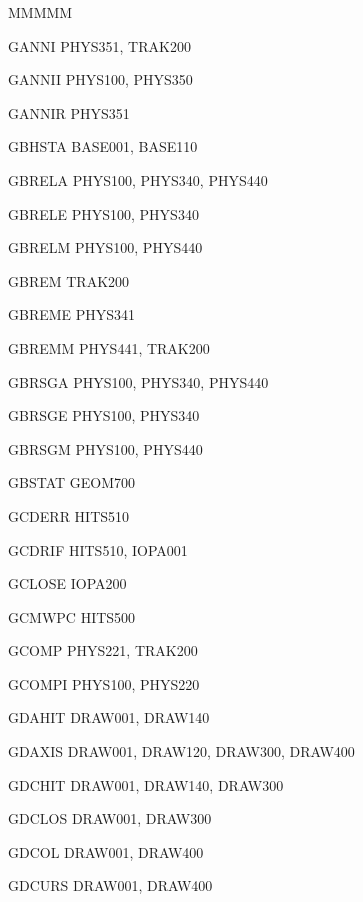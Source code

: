          
           
{\tt\begin{DL}{MMMMM}
\item[GANNI ]PHYS351, TRAK200
\item[GANNII]PHYS100, PHYS350
\item[GANNIR]PHYS351
\item[GBHSTA]BASE001, BASE110
\item[GBRELA]PHYS100, PHYS340, PHYS440
\item[GBRELE]PHYS100, PHYS340
\item[GBRELM]PHYS100, PHYS440
\item[GBREM ]TRAK200
\item[GBREME]PHYS341
\item[GBREMM]PHYS441, TRAK200
\item[GBRSGA]PHYS100, PHYS340, PHYS440
\item[GBRSGE]PHYS100, PHYS340
\item[GBRSGM]PHYS100, PHYS440
\item[GBSTAT]GEOM700
\item[GCDERR]HITS510
\item[GCDRIF]HITS510, IOPA001
\item[GCLOSE]IOPA200
\item[GCMWPC]HITS500
\item[GCOMP ]PHYS221, TRAK200
\item[GCOMPI]PHYS100, PHYS220
\item[GDAHIT]DRAW001, DRAW140
\item[GDAXIS]DRAW001, DRAW120, DRAW300, DRAW400
\item[GDCHIT]DRAW001, DRAW140, DRAW300
\item[GDCLOS]DRAW001, DRAW300
\item[GDCOL ]DRAW001, DRAW400
\item[GDCURS]DRAW001, DRAW400

\end{DL}}
